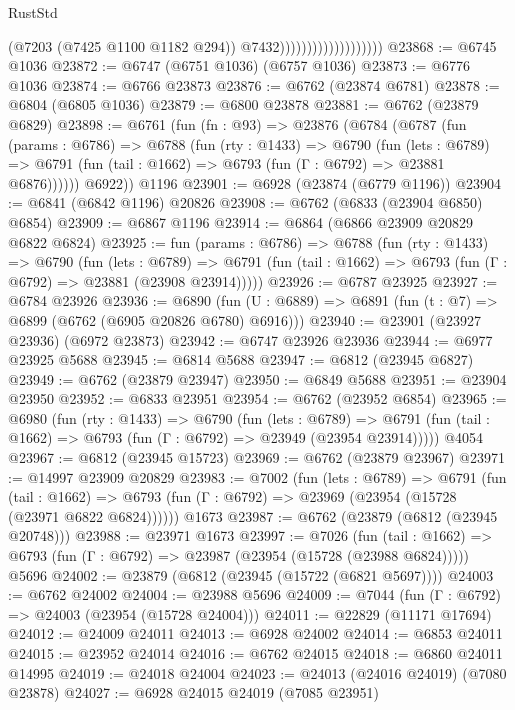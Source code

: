 \begin{lexlean}{RustStd}
\begin{coremodule}
                                          (@7203 (@7425 @1100 @1182 @294))
                                          @7432)))))))))))))))))))
@23868 := @6745 @1036
@23872 := @6747 (@6751 @1036) (@6757 @1036)
@23873 := @6776 @1036
@23874 := @6766 @23873
@23876 := @6762 (@23874 @6781)
@23878 := @6804 (@6805 @1036)
@23879 := @6800 @23878
@23881 := @6762 (@23879 @6829)
@23898 := @6761
    (fun (fn : @93) =>
    @23876
      (@6784
        (@6787
          (fun (params : @6786) =>
          @6788
            (fun (rty : @1433) =>
            @6790
              (fun (lets : @6789) =>
              @6791 (fun (tail : @1662) => @6793 (fun (Γ : @6792) => @23881 @6876))))))
        @6922))
    @1196
@23901 := @6928 (@23874 (@6779 @1196))
@23904 := @6841 (@6842 @1196) @20826
@23908 := @6762 (@6833 (@23904 @6850) @6854)
@23909 := @6867 @1196
@23914 := @6864 (@6866 @23909 @20829 @6822 @6824)
@23925 := fun (params : @6786) =>
  @6788
    (fun (rty : @1433) =>
    @6790
      (fun (lets : @6789) =>
      @6791 (fun (tail : @1662) => @6793 (fun (Γ : @6792) => @23881 (@23908 @23914)))))
@23926 := @6787 @23925
@23927 := @6784 @23926
@23936 := @6890
    (fun (U : @6889) => @6891 (fun (t : @7) => @6899 (@6762 (@6905 @20826 @6780) @6916)))
@23940 := @23901 (@23927 @23936) (@6972 @23873)
@23942 := @6747 @23926 @23936
@23944 := @6977 @23925 @5688
@23945 := @6814 @5688
@23947 := @6812 (@23945 @6827)
@23949 := @6762 (@23879 @23947)
@23950 := @6849 @5688
@23951 := @23904 @23950
@23952 := @6833 @23951
@23954 := @6762 (@23952 @6854)
@23965 := @6980
    (fun (rty : @1433) =>
    @6790
      (fun (lets : @6789) =>
      @6791 (fun (tail : @1662) => @6793 (fun (Γ : @6792) => @23949 (@23954 @23914)))))
    @4054
@23967 := @6812 (@23945 @15723)
@23969 := @6762 (@23879 @23967)
@23971 := @14997 @23909 @20829
@23983 := @7002
    (fun (lets : @6789) =>
    @6791
      (fun (tail : @1662) =>
      @6793 (fun (Γ : @6792) => @23969 (@23954 (@15728 (@23971 @6822 @6824))))))
    @1673
@23987 := @6762 (@23879 (@6812 (@23945 @20748)))
@23988 := @23971 @1673
@23997 := @7026
    (fun (tail : @1662) => @6793 (fun (Γ : @6792) => @23987 (@23954 (@15728 (@23988 @6824)))))
    @5696
@24002 := @23879 (@6812 (@23945 (@15722 (@6821 @5697))))
@24003 := @6762 @24002
@24004 := @23988 @5696
@24009 := @7044 (fun (Γ : @6792) => @24003 (@23954 (@15728 @24004)))
@24011 := @22829 (@11171 @17694)
@24012 := @24009 @24011
@24013 := @6928 @24002
@24014 := @6853 @24011
@24015 := @23952 @24014
@24016 := @6762 @24015
@24018 := @6860 @24011 @14995
@24019 := @24018 @24004
@24023 := @24013 (@24016 @24019) (@7080 @23878)
@24027 := @6928 @24015 @24019 (@7085 @23951)

\end{coremodule}
\end{lexlean}
